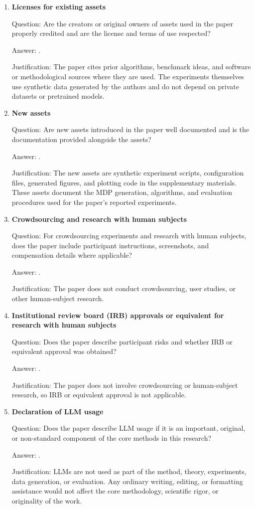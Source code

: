 \documentclass{article}
\theoremstyle{plain}
\theoremstyle{definition}
\theoremstyle{remark}
\begin{document}
\begin{enumerate}[leftmargin=5mm]
\item \textbf{Licenses for existing assets}

Question: Are the creators or original owners of assets used in the paper
properly credited and are the license and terms of use respected?

Answer: \answerYes{}.

Justification: The paper cites prior algorithms, benchmark ideas, and software
or methodological sources where they are used. The experiments themselves use
synthetic data generated by the authors and do not depend on private datasets or
pretrained models.

\item \textbf{New assets}

Question: Are new assets introduced in the paper well documented and is the
documentation provided alongside the assets?

Answer: \answerYes{}.

Justification: The new assets are synthetic experiment scripts,
configuration files, generated figures, and plotting code in the supplementary
materials. These assets document the MDP generation, algorithms, and evaluation
procedures used for the paper's reported experiments.

\item \textbf{Crowdsourcing and research with human subjects}

Question: For crowdsourcing experiments and research with human subjects, does
the paper include participant instructions, screenshots, and compensation
details where applicable?

Answer: \answerNA{}.

Justification: The paper does not conduct crowdsourcing, user studies, or other
human-subject research.

\item \textbf{Institutional review board (IRB) approvals or equivalent for
research with human subjects}

Question: Does the paper describe participant risks and whether IRB or
equivalent approval was obtained?

Answer: \answerNA{}.

Justification: The paper does not involve crowdsourcing or human-subject
research, so IRB or equivalent approval is not applicable.

\item \textbf{Declaration of LLM usage}

Question: Does the paper describe LLM usage if it is an important, original, or
non-standard component of the core methods in this research?

Answer: \answerNA{}.

Justification: LLMs are not used as part of the method, theory, experiments,
data generation, or evaluation. Any ordinary writing, editing, or formatting
assistance would not affect the core methodology, scientific rigor, or
originality of the work.
\end{enumerate}
\end{document}
